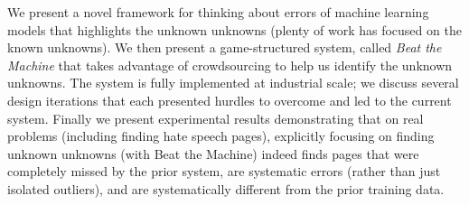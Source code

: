 We present a novel framework for thinking about errors of machine learning models that highlights the unknown unknowns (plenty of work has focused on the known unknowns).  We then present a game-structured system, called \emph{Beat the Machine} that takes advantage of crowdsourcing to help us identify the unknown unknowns.  The system is fully implemented at industrial scale; we discuss several design iterations that each presented hurdles to overcome and led to the current system.  Finally we present experimental results demonstrating that on real problems (including finding hate speech pages), explicitly focusing on finding unknown unknowns (with Beat the Machine) indeed finds pages that were completely missed by the prior system, are systematic errors (rather than just isolated outliers), and are systematically different from the prior training data. 

